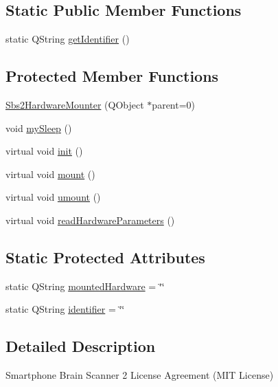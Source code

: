 \subsection*{Static Public Member Functions}
\begin{DoxyCompactItemize}
\item 
static Q\-String \hyperlink{classSbs2HardwareMounter_ae859631cf871c19b0b1163f26eacde4f}{get\-Identifier} ()
\end{DoxyCompactItemize}
\subsection*{Protected Member Functions}
\begin{DoxyCompactItemize}
\item 
\hyperlink{classSbs2HardwareMounter_a0b57bd594cc2519164ca079580937181}{Sbs2\-Hardware\-Mounter} (Q\-Object $\ast$parent=0)
\item 
void \hyperlink{classSbs2HardwareMounter_ac2129b6eb23d4eddcc9b388dee96ba18}{my\-Sleep} ()
\item 
virtual void \hyperlink{classSbs2HardwareMounter_aa6be696873d18aea5c5e27d6ff92105d}{init} ()
\item 
virtual void \hyperlink{classSbs2HardwareMounter_af6c3fc37fa15ecadcf968d6ffcae0ec6}{mount} ()
\item 
virtual void \hyperlink{classSbs2HardwareMounter_ae248c626ae5bf0d7a73550e859d96190}{umount} ()
\item 
virtual void \hyperlink{classSbs2HardwareMounter_a73ed9f3ddf38747263ca040f5e433270}{read\-Hardware\-Parameters} ()
\end{DoxyCompactItemize}
\subsection*{Static Protected Attributes}
\begin{DoxyCompactItemize}
\item 
static Q\-String \hyperlink{classSbs2HardwareMounter_a84df0b714f439793b05c23244b88fa4d}{mounted\-Hardware} = \char`\"{}\char`\"{}
\item 
static Q\-String \hyperlink{classSbs2HardwareMounter_a00ac9b3100310ddf9615116c8d33af9c}{identifier} = \char`\"{}\char`\"{}
\end{DoxyCompactItemize}


\subsection{Detailed Description}
Smartphone Brain Scanner 2 License Agreement (M\-I\-T License)

